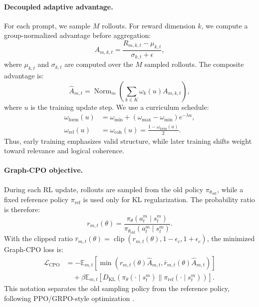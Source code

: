 \documentclass[sigconf, anonymous, review, screen]{acmart}
\begin{document}
\paragraph{Decoupled adaptive advantage.}
For each prompt, we sample $M$ rollouts. For reward dimension $k$, we compute a group-normalized advantage before aggregation:
\begin{equation}
A_{m,k,t}
=
\frac{R_{m,k,t}-\mu_{k,t}}{\sigma_{k,t}+\epsilon},
\end{equation}
where $\mu_{k,t}$ and $\sigma_{k,t}$ are computed over the $M$ sampled rollouts. The composite advantage is:
\begin{equation}
\hat A_{m,t}
=
\operatorname{Norm}_m
\left(
\sum_{k\in K}\omega_k(u)A_{m,k,t}
\right),
\label{eq:composite_advantage}
\end{equation}
where $u$ is the training update step. We use a curriculum schedule:
\begin{equation}
\begin{aligned}
\omega_{\mathrm{form}}(u)
&=
\omega_{\min}
+
(\omega_{\max}-\omega_{\min})e^{-\lambda u},\\
\omega_{\mathrm{rel}}(u)
&=
\omega_{\mathrm{coh}}(u)
=
\frac{1-\omega_{\mathrm{form}}(u)}{2}.
\end{aligned}
\label{eq:weights}
\end{equation}
Thus, early training emphasizes valid structure, while later training shifts weight toward relevance and logical coherence.

\paragraph{Graph-CPO objective.}
During each RL update, rollouts are sampled from the old policy $\pi_{\theta_{\mathrm{old}}}$, while a fixed reference policy $\pi_{\mathrm{ref}}$ is used only for KL regularization. The probability ratio is therefore:
\begin{equation}
r_{m,t}(\theta)
=
\frac{
\pi_\theta(a^m_t\mid s^m_t)
}{
\pi_{\theta_{\mathrm{old}}}(a^m_t\mid s^m_t)
}.
\end{equation}
With the clipped ratio $\bar r_{m,t}(\theta)=\operatorname{clip}(r_{m,t}(\theta),1-\epsilon_c,1+\epsilon_c)$, the minimized Graph-CPO loss is:
\begin{equation}
\begin{aligned}
\mathcal{L}_{\mathrm{CPO}}
&=
-\mathbb{E}_{m,t}
\left[
\min
\left(
r_{m,t}(\theta)\hat A_{m,t},
\bar r_{m,t}(\theta)\hat A_{m,t}
\right)
\right] \\
&\quad
+
\beta
\mathbb{E}_{m,t}
\left[
D_{\mathrm{KL}}
\left(
\pi_\theta(\cdot\mid s^m_t)
\|
\pi_{\mathrm{ref}}(\cdot\mid s^m_t)
\right)
\right].
\end{aligned}
\label{eq:graph_cpo_loss}
\end{equation}
This notation separates the old sampling policy from the reference policy, following PPO/GRPO-style optimization \cite{schulman2017proximal,shao2024deepseekmath}.
\end{document}
